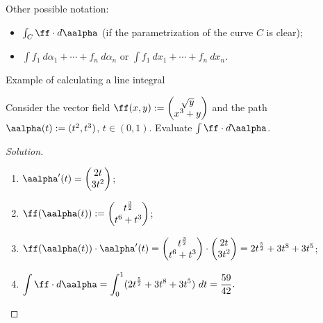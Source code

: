     {Other possible notation:}
    \begin{itemize}
        \item  \(\int_C \ff \cdot d\aalpha  \) (if the parametrization of the curve \(C\) is clear);
        \item \(\int f_1 \ d\alpha_1 + \cdots + f_n \ d\alpha_n\) or \(\int f_1 \ dx_1 + \cdots + f_n \ dx_n\).
    \end{itemize}





    {Example of calculating a line integral}


    \begin{example}
        Consider the vector field \(\ff(x,y) := \begin{pmatrix}
            \sqrt y \\ x^3 + y
        \end{pmatrix}\)
        and the path
        \(\aalpha(t):= (t^2,t^3)\), \(t \in (0,1)\).
        Evaluate \(\int \ff \cdot d\aalpha\).
    \end{example}
    \begin{proof}[Solution]
        \begin{enumerate}
            \item \(\aalpha'(t) = \begin{pmatrix}
                      2t \\ 3t^2
                  \end{pmatrix}\);
            \item \(\ff(\aalpha(t)) := \begin{pmatrix}
                      t^{\frac{3}{2}} \\ t^6 + t^3
                  \end{pmatrix}\);
            \item \( \ff(\aalpha(t)) \cdot  \aalpha'(t) = \begin{pmatrix}
                      t^{\frac{3}{2}} \\ t^6 + t^3
                  \end{pmatrix} \cdot  \begin{pmatrix}
                      2t \\ 3t^2
                  \end{pmatrix} = 2 t^{\frac{5}{2}} + 3t^8 + 3t^5\);
            \item
                  \(
                  \displaystyle\int \ff \cdot d\aalpha = \displaystyle\int_{0}^{1} (2 t^{\frac{5}{2}} + 3t^8 + 3t^5 ) \ dt = \frac{59}{42}.
                  \) \qedhere
        \end{enumerate}
    \end{proof}


